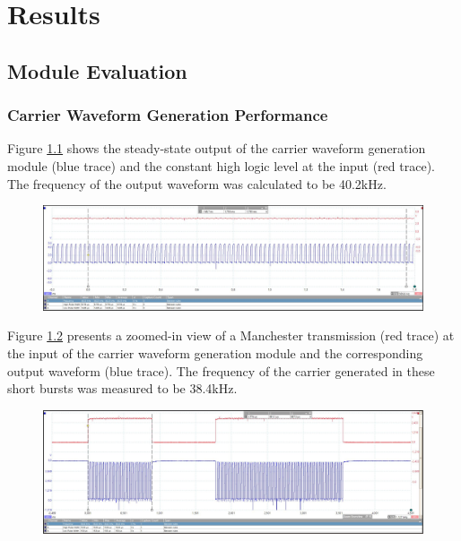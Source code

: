 \chapter{Results}
\label{ch_results}



\section{Module Evaluation}

\subsection{Carrier Waveform Generation Performance}

Figure \ref{fig:carrier_steady_state} shows the steady-state output of the carrier waveform generation module (blue trace) and the constant high logic level at the input (red trace). The frequency of the output waveform was calculated to be 40.2kHz.

\begin{figure}[H]
	\centering
	\includegraphics[width=.9\linewidth]{figures/results/carrier_waveform_generation/steady_state.JPG}
	\label{fig:carrier_steady_state}
\end{figure}

Figure \ref{fig:carrier_manchester_zoomed_view} presents a zoomed-in view of a Manchester transmission (red trace) at the input of the carrier waveform generation module and the corresponding output waveform (blue trace). The frequency of the carrier generated in these short bursts was measured to be 38.4kHz.

\begin{figure}[H]
	\centering
	\includegraphics[width=.9\linewidth]{figures/results/carrier_waveform_generation/manchester_zoomed_view.JPG}
	\label{fig:carrier_manchester_zoomed_view}
\end{figure}


